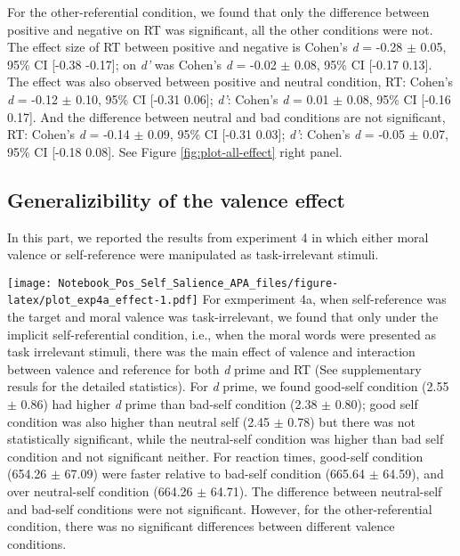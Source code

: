 \documentclass[man]{apa6}
\begin{document}
For the other-referential condition, we found that only the difference between positive and negative on RT was significant, all the other conditions were not. The effect size of RT between positive and negative is Cohen's \emph{d} = -0.28 \(\pm\) 0.05, 95\% CI {[}-0.38 -0.17{]}; on \emph{d'} was Cohen's \emph{d} = -0.02 \(\pm\) 0.08, 95\% CI {[}-0.17 0.13{]}. The effect was also observed between positive and neutral condition, RT: Cohen's \emph{d} = -0.12 \(\pm\) 0.10, 95\% CI {[}-0.31 0.06{]}; \emph{d'}: Cohen's \emph{d} = 0.01 \(\pm\) 0.08, 95\% CI {[}-0.16 0.17{]}. And the difference between neutral and bad conditions are not significant, RT: Cohen's \emph{d} = -0.14 \(\pm\) 0.09, 95\% CI {[}-0.31 0.03{]}; \emph{d'}: Cohen's \emph{d} = -0.05 \(\pm\) 0.07, 95\% CI {[}-0.18 0.08{]}. See Figure \ref{fig:plot-all-effect} right panel.

\hypertarget{generalizibility-of-the-valence-effect}{%
\subsection{Generalizibility of the valence effect}\label{generalizibility-of-the-valence-effect}}

In this part, we reported the results from experiment 4 in which either moral valence or self-reference were manipulated as task-irrelevant stimuli.

\texttt{[image: Notebook\_Pos\_Self\_Salience\_APA\_files/figure-latex/plot\_exp4a\_effect-1.pdf]}
For exmperiment 4a, when self-reference was the target and moral valence was task-irrelevant, we found that only under the implicit self-referential condition, i.e., when the moral words were presented as task irrelevant stimuli, there was the main effect of valence and interaction between valence and reference for both \emph{d} prime and RT (See supplementary resuls for the detailed statistics). For \emph{d} prime, we found good-self condition (2.55 \(\pm\) 0.86) had higher \emph{d} prime than bad-self condition (2.38 \(\pm\) 0.80); good self condition was also higher than neutral self (2.45 \(\pm\) 0.78) but there was not statistically significant, while the neutral-self condition was higher than bad self condition and not significant neither. For reaction times, good-self condition (654.26 \(\pm\) 67.09) were faster relative to bad-self condition (665.64 \(\pm\) 64.59), and over neutral-self condition (664.26 \(\pm\) 64.71). The difference between neutral-self and bad-self conditions were not significant. However, for the other-referential condition, there was no significant differences between different valence conditions.
\end{document}
